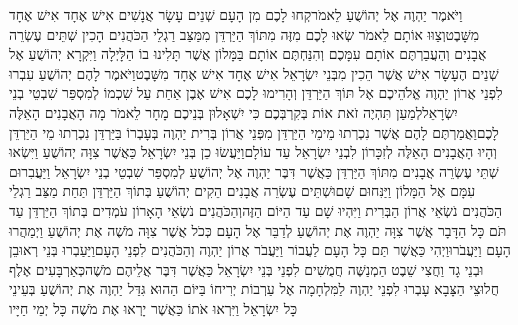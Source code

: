 \documentclass[../main/main.tex]{subfiles}
\begin{document}
\begin{multicols*}{\ncols}
וַיֹּאמֶר יַהְוֶה אֶל יְהוֹשֻׁעַ לֵאמֹר\PreVerseSpace{}קְחוּ לָכֶם מִן הָעָם שְׁנֵים עָשָׂר אֲנָשִׁים אִישׁ אֶחָד אִישׁ אֶחָד מִשָּׁבֶט\PreVerseSpace{}וְצַוּוּ אוֹתָם לֵאמֹר שְׂאוּ לָכֶם מִזֶּה מִתּוֹךְ הַיַּרְדֵּן מִמַּצַּב רַגְלֵי הַכֹּהֲנִים הָכִין שְׁתֵּים עֶשְׂרֵה אֲבָנִים וְהַעֲבַרְתֶּם אוֹתָם עִמָּכֶם וְהִנַּחְתֶּם אוֹתָם בַּמָּלוֹן אֲשֶׁר תָּלִינוּ בוֹ הַלָּיְלָה \ClosedSection{}וַיִּקְרָא יְהוֹשֻׁעַ אֶל שְׁנֵים הֶעָשָׂר אִישׁ אֲשֶׁר הֵכִין מִבְּנֵי יִשְׂרָאֵל אִישׁ אֶחָד אִישׁ אֶחָד מִשָּׁבֶט\PreVerseSpace{}וַיֹּאמֶר לָהֶם יְהוֹשֻׁעַ עִבְרוּ לִפְנֵי אֲרוֹן יַהְוֶה אֱלֹהֵיכֶם אֶל תּוֹךְ הַיַּרְדֵּן וְהָרִימוּ לָכֶם אִישׁ אֶבֶן אַחַת עַל שִׁכְמוֹ לְמִסְפַּר שִׁבְטֵי בְנֵי יִשְׂרָאֵל\PreVerseSpace{}לְמַעַן תִּהְיֶה זֹאת אוֹת בְּקִרְבְּכֶם כִּי יִשְׁאָלוּן בְּנֵיכֶם מָחָר לֵאמֹר מָה הָאֲבָנִים הָאֵלֶּה לָכֶם\PreVerseSpace{}וַאֲמַרְתֶּם לָהֶם אֲשֶׁר נִכְרְתוּ מֵימֵי הַיַּרְדֵּן מִפְּנֵי אֲרוֹן בְּרִית יַהְוֶה בְּעָבְרוֹ בַּיַּרְדֵּן נִכְרְתוּ מֵי הַיַּרְדֵּן וְהָיוּ הָאֲבָנִים הָאֵלֶּה לְזִכָּרוֹן לִבְנֵי יִשְׂרָאֵל עַד עוֹלָם\PreVerseSpace{}וַיַּעֲשׂוּ כֵן בְּנֵי יִשְׂרָאֵל כַּאֲשֶׁר צִוָּה יְהוֹשֻׁעַ וַיִּשְׂאוּ שְׁתֵּי עֶשְׂרֵה אֲבָנִים מִתּוֹךְ הַיַּרְדֵּן כַּאֲשֶׁר דִּבֶּר יַהְוֶה אֶל יְהוֹשֻׁעַ לְמִסְפַּר שִׁבְטֵי בְנֵי יִשְׂרָאֵל וַיַּעֲבִרוּם עִמָּם אֶל הַמָּלוֹן וַיַּנִּחוּם שָׁם\PreVerseSpace{}וּשְׁתֵּים עֶשְׂרֵה אֲבָנִים הֵקִים יְהוֹשֻׁעַ בְּתוֹךְ הַיַּרְדֵּן תַּחַת מַצַּב רַגְלֵי הַכֹּהֲנִים נֹשְׂאֵי אֲרוֹן הַבְּרִית וַיִּהְיוּ שָׁם עַד הַיּוֹם הַזֶּה\PreVerseSpace{}וְהַכֹּהֲנִים נֹשְׂאֵי הָאָרוֹן עֹמְדִים בְּתוֹךְ הַיַּרְדֵּן עַד תֹּם כָּל הַדָּבָר אֲשֶׁר צִוָּה יַהְוֶה אֶת יְהוֹשֻׁעַ לְדַבֵּר אֶל הָעָם כְּכֹל אֲשֶׁר צִוָּה מֹשֶׁה אֶת יְהוֹשֻׁעַ וַיְמַהֲרוּ הָעָם וַיַּעֲבֹרוּ\PreVerseSpace{}וַיְהִי כַּאֲשֶׁר תַּם כָּל הָעָם לַעֲבוֹר וַיַּעֲבֹר אֲרוֹן יַהְוֶה וְהַכֹּהֲנִים לִפְנֵי הָעָם\PreVerseSpace{}וַיַּעַבְרוּ בְּנֵי רְאוּבֵן וּבְנֵי גָד וַחֲצִי שֵׁבֶט הַמְנַשֶּׁה חֲמֻשִׁים לִפְנֵי בְּנֵי יִשְׂרָאֵל כַּאֲשֶׁר דִּבֶּר אֲלֵיהֶם מֹשֶׁה\PreVerseSpace{}כְּאַרְבָּעִים אֶלֶף חֲלוּצֵי הַצָּבָא עָבְרוּ לִפְנֵי יַהְוֶה לַמִּלְחָמָה אֶל עַרְבוֹת יְרִיחוֹ \ClosedSection{}בַּיּוֹם הַהוּא גִּדַּל יַהְוֶה אֶת יְהוֹשֻׁעַ בְּעֵינֵי כָּל יִשְׂרָאֵל וַיִּרְאוּ אֹתוֹ כַּאֲשֶׁר יָרְאוּ אֶת מֹשֶׁה כָּל יְמֵי חַיָּיו\OpenSection{}\par

\end{multicols*}
\end{document}
